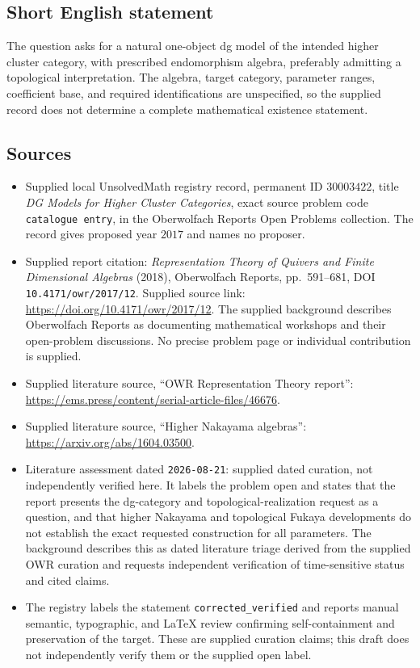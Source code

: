 \documentclass[11pt]{article}
\begin{document}
\subsection{Short English statement}
The question asks for a natural one-object dg model of the intended higher cluster category, with prescribed endomorphism algebra, preferably admitting a topological interpretation. The algebra, target category, parameter ranges, coefficient base, and required identifications are unspecified, so the supplied record does not determine a complete mathematical existence statement.
\subsection{Sources}
\begin{itemize}
\item Supplied local UnsolvedMath registry record, permanent ID \(30003422\), title \emph{DG Models for Higher Cluster Categories}, exact source problem code \texttt{catalogue entry}, in the Oberwolfach Reports Open Problems collection. The record gives proposed year \(2017\) and names no proposer.
\item Supplied report citation: \emph{Representation Theory of Quivers and Finite Dimensional Algebras} (2018), Oberwolfach Reports, pp.~591--681, DOI \texttt{10.4171/owr/2017/12}. Supplied source link: \url{https://doi.org/10.4171/owr/2017/12}. The supplied background describes Oberwolfach Reports as documenting mathematical workshops and their open-problem discussions. No precise problem page or individual contribution is supplied.
\item Supplied literature source, ``OWR Representation Theory report'': \url{https://ems.press/content/serial-article-files/46676}.
\item Supplied literature source, ``Higher Nakayama algebras'': \url{https://arxiv.org/abs/1604.03500}.
\item Literature assessment dated \texttt{2026-08-21}: supplied dated curation, not independently verified here. It labels the problem open and states that the report presents the dg-category and topological-realization request as a question, and that higher Nakayama and topological Fukaya developments do not establish the exact requested construction for all parameters. The background describes this as dated literature triage derived from the supplied OWR curation and requests independent verification of time-sensitive status and cited claims.
\item The registry labels the statement \texttt{corrected\_verified} and reports manual semantic, typographic, and LaTeX review confirming self-containment and preservation of the target. These are supplied curation claims; this draft does not independently verify them or the supplied open label.
\end{itemize}
\end{document}
